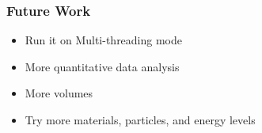\documentclass[aspectratio-169]{beamer}
\begin{document}

\begin{frame}
\frametitle{Future Work}
\begin{itemize}
\item Run it on Multi-threading mode
\item More quantitative data analysis
\item More volumes
\item Try more materials, particles, and energy levels
\end{itemize}
\end{frame}

\end{document}
